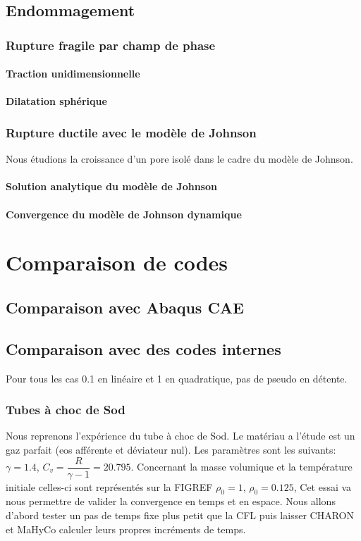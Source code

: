 \documentclass[10pt]{book}
\begin{document}
\section{Endommagement}
\subsection{Rupture fragile par champ de phase}
\ToDo{}
\subsubsection{Traction unidimensionnelle}
\ToDo{}
\subsubsection{Dilatation sphérique}
\ToDo{}
\subsection{Rupture ductile avec le modèle de Johnson}
Nous étudions la croissance d'un pore isolé dans le cadre du modèle de Johnson. 
\subsubsection{Solution analytique du modèle de Johnson}
\ToDo{}
\subsubsection{Convergence du modèle de Johnson dynamique}
\chapter{Comparaison de codes}\label{Chapitre:Comparaison autres codes}
\section{Comparaison avec Abaqus CAE}
\section{Comparaison avec des codes internes}
Pour tous les cas 0.1 en linéaire et 1 en quadratique, pas de pseudo en détente.
\subsection{Tubes à choc de Sod}
Nous reprenons l’expérience du tube à choc de Sod. Le matériau a l'étude est un gaz parfait (eos afférente et déviateur nul). Les paramètres sont les suivants: $\gamma= 1.4$, $C_{v}=\dfrac{R}{\gamma-1}=20.795$. Concernant la masse volumique et la température initiale celles-ci sont représentés sur la FIGREF
$\rho_{0} = 1$, $\rho_{0}=0.125$, 
Cet essai va nous permettre de valider la convergence en temps et en espace. Nous allons d'abord tester un pas de temps fixe plus petit que la CFL puis laisser CHARON et MaHyCo calculer leurs propres incréments de temps.
\end{document}

